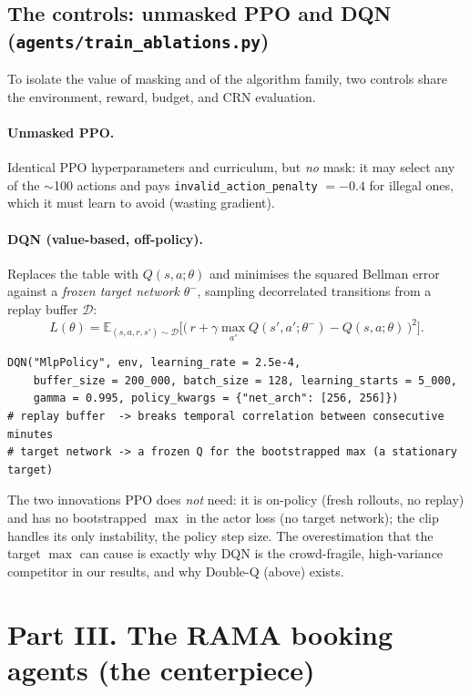 \documentclass[11pt]{article}
\newcommand{\file}[1]{\texttt{\small #1}}
\newcommand{\co}[1]{\texttt{\small #1}}
\newcommand{\E}{\mathbb{E}}
\begin{document}
\subsection{The controls: unmasked PPO and DQN (\file{agents/train\_ablations.py})}

To isolate the value of masking and of the algorithm family, two controls share the
environment, reward, budget, and CRN evaluation.

\paragraph{Unmasked PPO.} Identical PPO hyperparameters and curriculum, but \emph{no}
mask: it may select any of the $\sim$100 actions and pays \co{invalid\_action\_penalty}
$=-0.4$ for illegal ones, which it must learn to avoid (wasting gradient).

\paragraph{DQN (value-based, off-policy).} Replaces the table with $Q(s,a;\theta)$ and
minimises the squared Bellman error against a \emph{frozen target network} $\theta^-$,
sampling decorrelated transitions from a replay buffer $\mathcal{D}$:
\[
L(\theta)=\E_{(s,a,r,s')\sim\mathcal{D}}\Big[\big(\,r+\gamma\max_{a'}Q(s',a';\theta^-)-Q(s,a;\theta)\,\big)^2\Big].
\]

\begin{lstlisting}
DQN("MlpPolicy", env, learning_rate = 2.5e-4,
    buffer_size = 200_000, batch_size = 128, learning_starts = 5_000,
    gamma = 0.995, policy_kwargs = {"net_arch": [256, 256]})
# replay buffer  -> breaks temporal correlation between consecutive minutes
# target network -> a frozen Q for the bootstrapped max (a stationary target)
\end{lstlisting}

\noindent The two innovations PPO does \emph{not} need: it is on-policy (fresh rollouts,
no replay) and has no bootstrapped $\max$ in the actor loss (no target network); the clip
handles its only instability, the policy step size. The overestimation that the target
$\max$ can cause is exactly why DQN is the crowd-fragile, high-variance competitor in our
results, and why Double-Q (above) exists.

\section{Part III. The RAMA booking agents (the centerpiece)}
\end{document}

